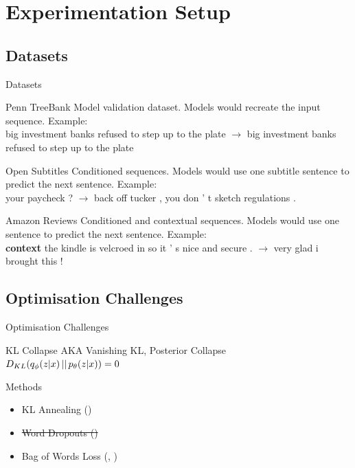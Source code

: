 \documentclass[aspectratio=169, 11pt]{beamer}
\begin{document}
\section{Experimentation Setup}

\subsection{Datasets}
\begin{frame}{Datasets}

  \begin{block}{Penn TreeBank} 
  Model validation dataset. Models would recreate the input sequence. Example:\\
  \footnotesize{big investment banks refused to step up to the plate $\rightarrow$ big investment banks refused to step up to the plate}
  \end{block}
  \begin{block}{Open Subtitles} 
  Conditioned sequences. Models would use one subtitle sentence to predict the next sentence. Example:\\
  \footnotesize{your paycheck ? $\rightarrow$ back off tucker , you don ' t sketch regulations .}
  \end{block}
  \begin{block}{Amazon Reviews} 
  Conditioned and contextual sequences. Models would use one sentence to predict the next sentence.
  Example:\\
  \footnotesize{\textbf{context} the kindle is velcroed in so it ' s nice and secure . $\rightarrow$ very glad i brought this !}
  \end{block}
\end{frame}

\subsection{Optimisation Challenges}
\begin{frame}{Optimisation Challenges}
  \begin{block}{KL Collapse}
  AKA Vanishing KL, Posterior Collapse\\
  $D_{KL}(q_{\phi}(z|x)\thinspace||\thinspace p_\theta(z|x)) = 0$
  \end{block}
  \begin{block}{Methods}
  \begin{itemize}
    \item KL Annealing (\cite{bowman_generating_2015})
    \item \sout{Word Dropouts (\cite{bowman_generating_2015})}
    \item Bag of Words Loss (\cite{zhao_learning_2017}, \cite{du_variational_2018})
  \end{itemize}
  \end{block}
  \end{frame}
\end{document}
